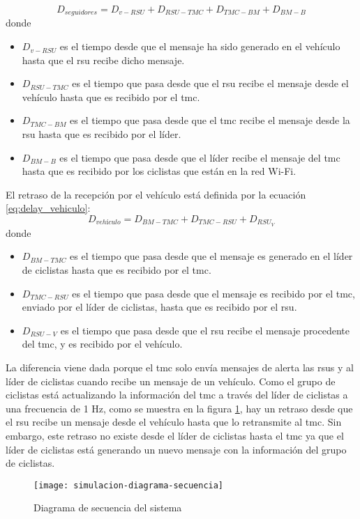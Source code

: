\begin{equation}\label{eq:delay_seguidores}
D_{seguidores} = D_{v-RSU} + D_{RSU-TMC} + D_{TMC-BM} + D_{BM-B}
\end{equation}
donde
\begin{itemize}
	\item $D_{v-RSU}$ es el tiempo desde que el mensaje ha sido generado en el vehículo hasta que el \gls{rsu} recibe dicho mensaje.
	
	\item $D_{RSU-TMC}$ es el tiempo que pasa desde que el \gls{rsu} recibe el mensaje desde el vehículo hasta que es recibido por el \gls{tmc}.
	
	\item $D_{TMC-BM}$ es el tiempo que pasa desde que el \gls{tmc} recibe el mensaje desde la \gls{rsu} hasta que es recibido por el líder.
	
	\item $D_{BM-B}$ es el tiempo que pasa desde que el líder recibe el mensaje del \gls{tmc} hasta que es recibido por los ciclistas que están en la red Wi-Fi.
\end{itemize}
El retraso de la recepción por el vehículo está definida por la ecuación \ref{eq:delay_vehiculo}:
\begin{equation}\label{eq:delay_vehiculo}
D_{vehículo} = D_{BM-TMC} + D_{TMC-RSU} + D_{RSU_V}
\end{equation}
donde
\begin{itemize}
	\item $D_{BM-TMC}$ es el tiempo que pasa desde que el mensaje es generado en el líder de ciclistas hasta que es recibido por el \gls{tmc}.

	\item $D_{TMC-RSU}$ es el tiempo que pasa desde que el mensaje es recibido por el \gls{tmc}, enviado por el líder de ciclistas, hasta que es recibido por el \gls{rsu}.
	
	\item $D_{RSU-V}$ es el tiempo que pasa desde que el \gls{rsu} recibe el mensaje procedente del \gls{tmc}, y es recibido por el vehículo.
\end{itemize}

La diferencia viene dada porque el \gls{tmc} solo envía mensajes de alerta las \gls{rsu}s y al líder de ciclistas cuando recibe un mensaje de un vehículo. Como el grupo de ciclistas está actualizando la información del \gls{tmc} a través del líder de ciclistas a una frecuencia de 1 Hz, como se muestra en la figura \ref{fig:simulacion-diagrama-secuencia}, hay un retraso desde que el \gls{rsu} recibe un mensaje desde el vehículo hasta que lo retransmite al \gls{tmc}. Sin embargo, este retraso no existe desde el líder de ciclistas hasta el \gls{tmc} ya que el líder de ciclistas está generando un nuevo mensaje con la información del grupo de ciclistas.

\begin{figure}[ht]
	\texttt{[image: simulacion-diagrama-secuencia]}
	\caption{Diagrama de secuencia del sistema}
	\label{fig:simulacion-diagrama-secuencia}
\end{figure}